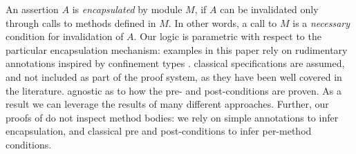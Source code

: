 An assertion $A$  is
\emph{encapsulated} by  module $M$, if  $A$ can be invalidated only through
calls to methods defined in $M$.
  In other words, a  call to  $M$  is a \emph{necessary} condition for
invalidation of $A$.
Our \Nec logic  is parametric with respect to the 
particular encapsulation
mechanism: examples in this paper rely on rudimentary annotations inspired by confinement types
\cite{confined}.
 classical specifications are assumed, and not 
included as part of the proof system, as they have been well covered in the literature.
{ agnostic as to how  the pre- and post-conditions  are proven.
As a result we can leverage the results of many different approaches.
Further, our proofs of \Nec do not inspect method
bodies: we rely on simple annotations to infer encapsulation, and
 classical pre and post-conditions  to infer per-method conditions. }
 


